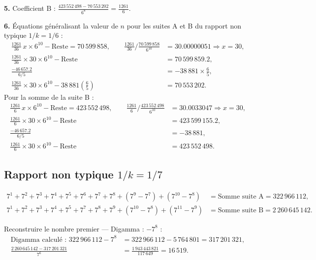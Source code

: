 \documentclass[11pt,a4paper]{article}
\begin{document}
\textbf{5.} Coefficient B :
$\displaystyle \frac{423\,552\,498 - 70\,553\,202}{6^{8}} = \frac{1261}{6}$.

\textbf{6.} Équations généralisant la valeur de $n$ pour les suites A et B du
rapport non typique $1/k = 1/6$ :
\begin{align*}
\frac{1261}{36}\, x \times 6^{10} - \text{Reste} = 70\,599\,858,
\qquad
\frac{1261}{36}\Big/\frac{70\,599\,858}{6^{10}}
&=30.00000051\Rightarrow x=30,\\
\frac{1261}{36}\times30\times6^{10}-\text{Reste}
&=70\,599\,859.2,\\
\frac{-46\,657.2}{6/5} &=-38\,881\times\frac{6}{5},\\
\frac{1261}{36}\times30\times6^{10}
-38\,881\left(\frac{6}{5}\right)
&=70\,553\,202.
\end{align*}
Pour la somme de la suite B :
\begin{align*}
\frac{1261}{6}\, x \times 6^{10} - \text{Reste} = 423\,552\,498,
\qquad
\frac{1261}{6}\Big/\frac{423\,552\,498}{6^{10}}
&=30.0033047\Rightarrow x=30,\\
\frac{1261}{6}\times30\times6^{10}-\text{Reste}
&=423\,599\,155.2,\\
\frac{-46\,657.2}{6/5} &=-38\,881,\\
\frac{1261}{6}\times30\times6^{10}-\text{Reste}
&=423\,552\,498.
\end{align*}

\subsection{Rapport non typique $1/k = 1/7$}

\begin{boiteformule}[Sommes des suites A et B --- rapport $1/7$, $n = 10$]
\begin{align*}
7^{1}+7^{2}+7^{3}+7^{4}+7^{5}+7^{6}+7^{7}+7^{8}+(7^{9}-7^{7})+(7^{10}-7^{8})
  &= \text{Somme suite A} = 322\,966\,112,\\
7^{1}+7^{2}+7^{3}+7^{4}+7^{5}+7^{7}+7^{8}+7^{9}+(7^{10}-7^{8})+(7^{11}-7^{9})
  &= \text{Somme suite B} = 2\,260\,645\,142.
\end{align*}
\end{boiteformule}

Reconstruire le nombre premier --- Digamma : $-7^{8}$ :
\begin{align*}
\text{Digamma calculé : }322\,966\,112-7^{8}
&=322\,966\,112-5\,764\,801=317\,201\,321,\\
\frac{2\,260\,645\,142-317\,201\,321}{7^{6}}
&=\frac{1\,943\,443\,821}{117\,649}=16\,519.
\end{align*}
\end{document}
